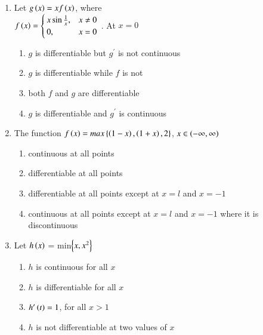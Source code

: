 \documentclass[journal]{IEEEtran}
\numberwithin{equation}{enumi}
\numberwithin{figure}{enumi}
\begin{document}
\begin{enumerate}
    \item 
    Let $g\left(x\right)=xf\left(x\right)$, where\\[6pt] $f\left(x\right) = \begin{cases}
        x\sin\frac{1}{x}, & x\neq 0\\
        0, & x=0
    \end{cases}$
    . At $x=0$ 
	
    \hfill{}
    
    \begin{enumerate}
        
	    \item $g$ is differentiable but $g^{\prime}$ is not continuous
        \item $g$ is differentiable while $f$ is not
        \item both $f$ and $g$ are differentiable
	\item $g$ is differentiable and $g^{\prime}$ is continuous 
    \end{enumerate}

    \item 
	    The function $f\left(x\right) = max\left\{\left(1-x\right),\left(1+x\right),2\right\}$, $x\in \left(-\infty,\infty\right)$  

    \hfill{}
    
    \begin{enumerate}    
        \item continuous at all points
        \item differentiable at all points
        \item differentiable at all points except at $x=l$ and $x=-1$
        \item continuous at all points except at $x=l$ and $x=-1$ where it is discontinuous
    \end{enumerate}


    \item 
    Let $h\left(x\right)$ = min$\left\{x,x^{2}\right\}$ 
    
    \hfill{}

    \begin{enumerate}
	\item $h$ is continuous for all $x$
        \item $h$ is differentiable for all $x$
	\item $h^{\prime}\left(t\right)=1$, for all $x >1$
        \item $h$ is not differentiable at two values of $x$
    \end{enumerate}



\end{enumerate}
\end{document}
